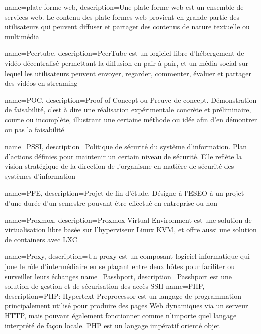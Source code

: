 {
    name=plate-forme web,
    description={Une plate-forme web est un ensemble de services web. Le contenu des plate-formes web provient en grande partie des utilisateurs qui peuvent diffuser et partager des contenus de nature textuelle ou multimédia}
}

{
    name=Peertube,
    description={PeerTube est un logiciel libre d'hébergement de vidéo décentralisé permettant la diffusion en pair à pair, et un média social sur lequel les utilisateurs peuvent envoyer, regarder, commenter, évaluer et partager des vidéos en streaming}
}

{
    name=POC,
    description={Proof of Concept ou Preuve de concept. Démonstration de faisabilité, c'est à dire une réalisation expérimentale concrète et préliminaire, courte ou incomplète, illustrant une certaine méthode ou idée afin d'en démontrer ou pas la faisabilité}
}

{
    name=PSSI,
    description={Politique de sécurité du système d'information. Plan d'actions définies pour maintenir un certain niveau de sécurité. Elle reflète la vision stratégique de la direction de l'organisme en matière de sécurité des systèmes d'information}
}

{
    name=PFE,
    description={Projet de fin d'étude. Désigne à l'ESEO à un projet d'une durée d'un semestre pouvant être effectué en entreprise ou non}
}

{
    name=Proxmox,
    description={Proxmox Virtual Environment est une solution de virtualisation libre basée sur l'hyperviseur Linux KVM, et offre aussi une solution de containers avec LXC}
}

{
    name=Proxy,
    description={Un proxy est un composant logiciel informatique qui joue le rôle d'intermédiaire en se plaçant entre deux hôtes pour faciliter ou surveiller leurs échanges}
}
{
    name=Passhport,
    description={Passhport est une solution de gestion et de sécurisation des accès SSH}
}
{
    name=PHP,
    description={PHP: Hypertext Preprocessor est un langage de programmation principalement utilisé pour produire des pages Web dynamiques via un serveur HTTP, mais pouvant également fonctionner comme n'importe quel langage interprété de façon locale. PHP est un langage impératif orienté objet}
}



